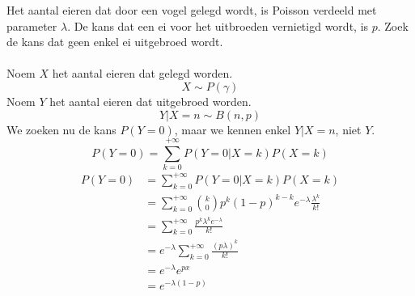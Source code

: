 \documentclass[main.tex]{subfiles}
\begin{document}
\begin{oef}
  Het aantal eieren dat door een vogel gelegd wordt, is Poisson verdeeld met parameter $\lambda$.
  De kans dat een ei voor het uitbroeden vernietigd wordt, is $p$.
  Zoek de kans dat geen enkel ei uitgebroed wordt.\\\\
  Noem $X$ het aantal eieren dat gelegd worden.
  \[ X \sim P(\gamma) \]
  Noem $Y$ het aantal eieren dat uitgebroed worden.
  \[ Y | X = n \sim B(n,p) \]
  We zoeken nu de kans $P(Y=0)$, maar we kennen enkel $Y|X=n$, niet $Y$.
  \[ P(Y=0) = \sum_{k=0}^{+\infty}P(Y=0|X=k)P(X=k) \]
  \[
  \begin{array}{rl}
    P(Y=0)
    &= \sum_{k=0}^{+\infty}P(Y=0|X=k)P(X=k)\\
    &= \sum_{k=0}^{+\infty}\binom{k}{0}p^{k}(1-p)^{k-k}e^{-\lambda}\frac{\lambda^{k}}{k!}\\
    &= \sum_{k=0}^{+\infty}\frac{p^{k}\lambda^{k}e^{-\lambda}}{k!}\\
    &= e^{-\lambda} \sum_{k=0}^{+\infty}\frac{(p\lambda)^{k}}{k!}\\
    &= e^{-\lambda} e^{px}\\
    &= e^{-\lambda(1-p)}\\
  \end{array}
  \]
\end{oef}
\end{document}
